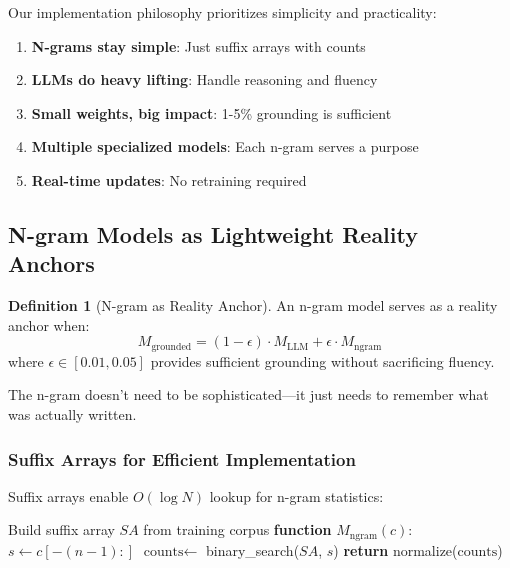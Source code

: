 \documentclass{article}
\theoremstyle{definition}
\newtheorem{definition}{Definition}
\begin{document}
Our implementation philosophy prioritizes simplicity and practicality:

\begin{enumerate}
    \item \textbf{N-grams stay simple}: Just suffix arrays with counts
    \item \textbf{LLMs do heavy lifting}: Handle reasoning and fluency
    \item \textbf{Small weights, big impact}: 1-5\% grounding is sufficient
    \item \textbf{Multiple specialized models}: Each n-gram serves a purpose
    \item \textbf{Real-time updates}: No retraining required
\end{enumerate}

\subsection{N-gram Models as Lightweight Reality Anchors}

\begin{definition}[N-gram as Reality Anchor]
An n-gram model serves as a reality anchor when:
\begin{equation}
M_{\text{grounded}} = (1-\epsilon) \cdot M_{\text{LLM}} + \epsilon \cdot M_{\text{ngram}}
\end{equation}
where $\epsilon \in [0.01, 0.05]$ provides sufficient grounding without sacrificing fluency.
\end{definition}

The n-gram doesn't need to be sophisticated—it just needs to remember what was actually written.

\subsubsection{Suffix Arrays for Efficient Implementation}

Suffix arrays enable $O(\log N)$ lookup for n-gram statistics:

\begin{algorithm}
\caption{N-gram Model with Suffix Array}
\begin{algorithmic}[1]
\STATE Build suffix array $SA$ from training corpus
\STATE \textbf{function} $M_{\text{ngram}}(c)$:
\STATE \quad $s \leftarrow c[-(n-1):]$ 
\STATE \quad $\text{counts} \leftarrow$ binary\_search($SA$, $s$)
\STATE \quad \textbf{return} normalize($\text{counts}$)
\end{algorithmic}
\end{algorithm}
\end{document}
